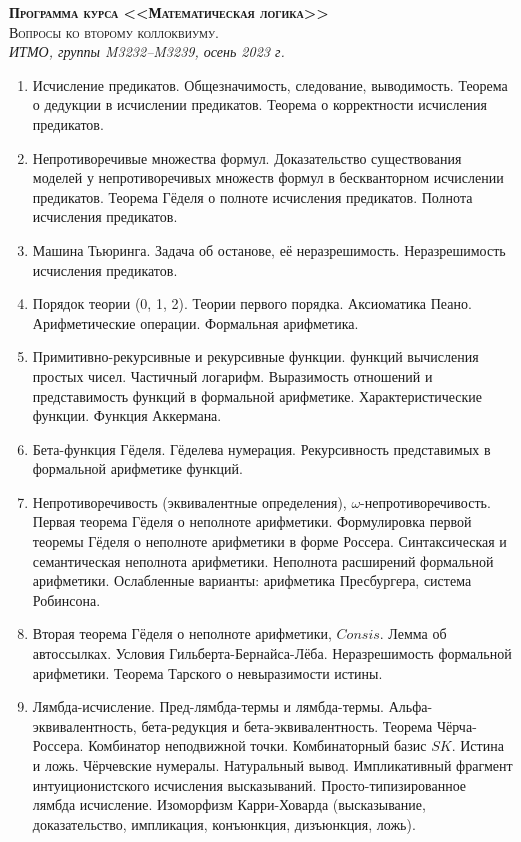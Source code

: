 \documentclass[11pt,a4paper,oneside]{scrartcl}
\begin{document}
\pagestyle{empty}

\begin{center}
{\large\scshape\bfseries Программа курса <<Математическая логика>>}\\
{\large\scshape Вопросы ко второму коллоквиуму.}\\
\itshape ИТМО, группы M3232--M3239, осень 2023 г.
\end{center}


\begin{enumerate}
\item Исчисление предикатов. Общезначимость, следование, выводимость. Теорема о дедукции в исчислении предикатов.
Теорема о корректности исчисления предикатов.
\item Непротиворечивые множества формул. Доказательство существования моделей у непротиворечивых множеств формул 
в бескванторном исчислении предикатов.
Теорема Гёделя о полноте исчисления предикатов. Полнота исчисления предикатов.
\item Машина Тьюринга. Задача об останове, её неразрешимость. Неразрешимость исчисления предикатов.
\item Порядок теории (0, 1, 2). Теории первого порядка. Аксиоматика Пеано. Арифметические операции. Формальная арифметика. 
\item Примитивно-рекурсивные и рекурсивные функции. 
функций вычисления простых чисел. Частичный логарифм.
Выразимость отношений и представимость функций в формальной арифметике. Характеристические функции.
Функция Аккермана. 
\item Бета-функция Гёделя. 
Гёделева нумерация. Рекурсивность представимых в формальной арифметике функций.
\item Непротиворечивость (эквивалентные определения), $\omega$-не\-про\-ти\-во\-ре\-чи\-вость. 
Первая теорема Гёделя о неполноте арифметики.
Формулировка первой теоремы Гёделя о неполноте арифметики в форме Россера. 
Синтаксическая и семантическая неполнота арифметики.
Неполнота расширений формальной арифметики.
Ослабленные варианты: арифметика Пресбургера, система Робинсона.
\item Вторая теорема Гёделя о неполноте арифметики, $Consis$. 
Лемма об автоссылках. Условия Гильберта-Бернайса-Лёба. Неразрешимость формальной арифметики. Теорема Тарского о невыразимости истины.
\item Лямбда-исчисление. Пред-лямбда-термы и лямбда-термы. Альфа-эквивалентность, бета-редукция
и бета-эквивалентность. Теорема Чёрча-Россера. 
Комбинатор неподвижной точки. Комбинаторный базис $SK$.
Истина и ложь. Чёрчевские нумералы. 
Натуральный вывод. Импликативный фрагмент интуиционистского исчисления высказываний.
Просто-типизированное лямбда исчисление. Изоморфизм Карри-Ховарда (высказывание, доказательство, импликация, конъюнкция, дизъюнкция, ложь). 
\end{enumerate}
\end{document}
